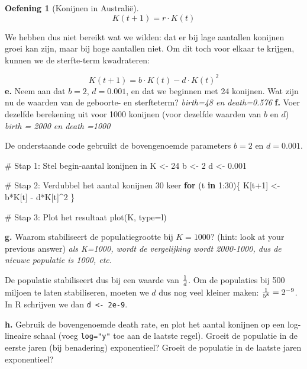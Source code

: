 \documentclass[
  a4paper,
]{scrbook}
\newenvironment{Shaded}{\begin{snugshade}}{\end{snugshade}}
\newcommand{\AttributeTok}[1]{\textcolor[rgb]{0.40,0.45,0.13}{#1}}
\newcommand{\CommentTok}[1]{\textcolor[rgb]{0.37,0.37,0.37}{#1}}
\newcommand{\ControlFlowTok}[1]{\textcolor[rgb]{0.00,0.23,0.31}{\textbf{#1}}}
\newcommand{\DecValTok}[1]{\textcolor[rgb]{0.68,0.00,0.00}{#1}}
\newcommand{\FloatTok}[1]{\textcolor[rgb]{0.68,0.00,0.00}{#1}}
\newcommand{\FunctionTok}[1]{\textcolor[rgb]{0.28,0.35,0.67}{#1}}
\newcommand{\NormalTok}[1]{\textcolor[rgb]{0.00,0.23,0.31}{#1}}
\newcommand{\OtherTok}[1]{\textcolor[rgb]{0.00,0.23,0.31}{#1}}
\newcommand{\SpecialCharTok}[1]{\textcolor[rgb]{0.37,0.37,0.37}{#1}}
\newcommand{\StringTok}[1]{\textcolor[rgb]{0.13,0.47,0.30}{#1}}
\theoremstyle{definition}
\newtheorem{exercise}{Oefening}[chapter]
\theoremstyle{remark}
\begin{document}
\begin{exercise}[Konijnen in
Australië]
\[
K(t+1) = r \cdot K(t) 
\]

We hebben dus niet bereikt wat we wilden: dat er bij lage aantallen
konijnen groei kan zijn, maar bij hoge aantallen niet. Om dit toch voor
elkaar te krijgen, kunnen we de sterfte-term kwadrateren:

\[
K(t+1) = b \cdot K(t) - d \cdot K(t)^2
\] \textbf{e.} Neem aan dat \(b=2\), \(d=0.001\), en dat we beginnen met
24 konijnen. Wat zijn nu de waarden van de geboorte- en sterfteterm?
\emph{birth=48 en death=0.576} \textbf{f.} Voer dezelfde berekening uit
voor 1000 konijnen (voor dezelfde waarden van \(b\) en \(d\))
\emph{birth = 2000 en death =1000}

De onderstaande code gebruikt de bovengenoemde parameters \(b=2\) en
\(d=0.001\).

\begin{Shaded}
\begin{Highlighting}[]
\CommentTok{\# Stap 1: Stel begin{-}aantal konijnen in}
\NormalTok{K }\OtherTok{\textless{}{-}} \DecValTok{24}
\NormalTok{b }\OtherTok{\textless{}{-}} \DecValTok{2}
\NormalTok{d }\OtherTok{\textless{}{-}} \FloatTok{0.001}

\CommentTok{\# Stap 2: Verdubbel het aantal konijnen 30 keer}
\ControlFlowTok{for}\NormalTok{ (t }\ControlFlowTok{in} \DecValTok{1}\SpecialCharTok{:}\DecValTok{30}\NormalTok{)\{}
\NormalTok{  K[t}\SpecialCharTok{+}\DecValTok{1}\NormalTok{] }\OtherTok{\textless{}{-}}\NormalTok{ b}\SpecialCharTok{*}\NormalTok{K[t] }\SpecialCharTok{{-}}\NormalTok{ d}\SpecialCharTok{*}\NormalTok{K[t]}\SpecialCharTok{\^{}}\DecValTok{2}
\NormalTok{\}}

\CommentTok{\# Stap 3: Plot het resultaat}
\FunctionTok{plot}\NormalTok{(K, }\AttributeTok{type=}\StringTok{\textquotesingle{}l\textquotesingle{}}\NormalTok{)}
\end{Highlighting}
\end{Shaded}

\textbf{g.} Waarom stabiliseert de populatiegrootte bij \(K=1000\)?
(hint: look at your previous answer) \emph{als K=1000, wordt de
vergelijking wordt 2000-1000, dus de nieuwe populatie is 1000, etc.}

De populatie stabiliseert dus bij een waarde van \(1 \over d\). Om de
populaties bij 500 miljoen te laten stabiliseren, moeten we \(d\) dus
nog veel kleiner maken: \({1 \over 5^8} = 2^{-9}\). In R schrijven we
dan \texttt{d\ \textless{}-\ 2e-9}.

\textbf{h.} Gebruik de bovengenoemde death rate, en plot het aantal
konijnen op een log-lineaire schaal (voeg \texttt{log="y"} toe aan de
laatste regel). Groeit de populatie in de eerste jaren (bij benadering)
exponentieel? Groeit de populatie in de laatste jaren exponentieel?


\end{exercise}
\end{document}
